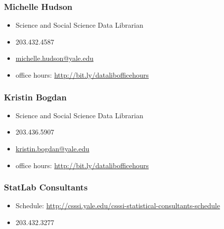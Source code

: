 \documentclass[]{article}
\begin{document}
\subsubsection{Michelle Hudson}\label{michelle-hudson}

\begin{itemize}
\itemsep1pt\parskip0pt
\item
  Science and Social Science Data Librarian
\item
  203.432.4587
\item
  \url{michelle.hudson@yale.edu}
\item
  office hours: \url{http://bit.ly/datalibofficehours}
\end{itemize}

\subsubsection{Kristin Bogdan}\label{kristin-bogdan}

\begin{itemize}
\itemsep1pt\parskip0pt
\item
  Science and Social Science Data Librarian
\item
  203.436.5907
\item
  \url{kristin.bogdan@yale.edu}
\item
  office hours: \url{http://bit.ly/datalibofficehours}
\end{itemize}

\subsubsection{StatLab Consultants}\label{statlab-consultants-2}

\begin{itemize}
\itemsep1pt\parskip0pt
\item
  Schedule:
  \url{http://csssi.yale.edu/csssi-statistical-consultants-schedule}
\item
  203.432.3277
\end{itemize}
\end{document}
